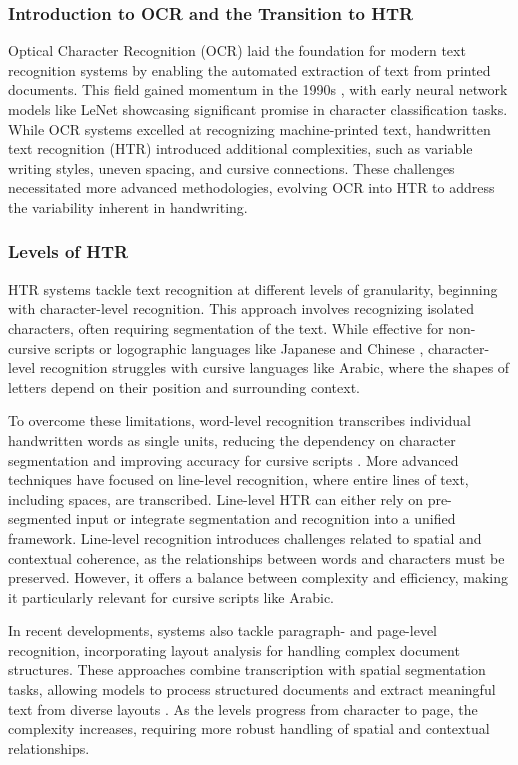 \documentclass[conference]{IEEEtran}
\begin{document}
\subsubsection{Introduction to OCR and the Transition to HTR}
Optical Character Recognition (OCR) laid the foundation for modern text recognition systems by enabling the automated extraction of text from printed documents. This field gained momentum in the 1990s \cite{parvez2013offline}, with early neural network models like LeNet \cite{lecun1998gradient} showcasing significant promise in character classification tasks. While OCR systems excelled at recognizing machine-printed text, handwritten text recognition (HTR) introduced additional complexities, such as variable writing styles, uneven spacing, and cursive connections. These challenges necessitated more advanced methodologies, evolving OCR into HTR to address the variability inherent in handwriting.


\subsubsection{Levels of HTR}

HTR systems tackle text recognition at different levels of granularity, beginning with character-level recognition. This approach involves recognizing isolated characters, often requiring segmentation of the text. While effective for non-cursive scripts or logographic languages like Japanese \cite{clanuwat2019kuronet} and Chinese \cite{jaderberg2015spatial}, character-level recognition struggles with cursive languages like Arabic, where the shapes of letters depend on their position and surrounding context.

To overcome these limitations, word-level recognition transcribes individual handwritten words as single units, reducing the dependency on character segmentation and improving accuracy for cursive scripts \cite{bhunia2019handwriting}. More advanced techniques have focused on line-level recognition, where entire lines of text, including spaces, are transcribed. Line-level HTR can either rely on pre-segmented input or integrate segmentation and recognition into a unified framework. Line-level recognition introduces challenges related to spatial and contextual coherence, as the relationships between words and characters must be preserved. However, it offers a balance between complexity and efficiency, making it particularly relevant for cursive scripts like Arabic.

In recent developments, systems also tackle paragraph- and page-level recognition, incorporating layout analysis for handling complex document structures. These approaches combine transcription with spatial segmentation tasks, allowing models to process structured documents and extract meaningful text from diverse layouts \cite{such2018fully, bhunia2019handwriting}. As the levels progress from character to page, the complexity increases, requiring more robust handling of spatial and contextual relationships.
\end{document}
